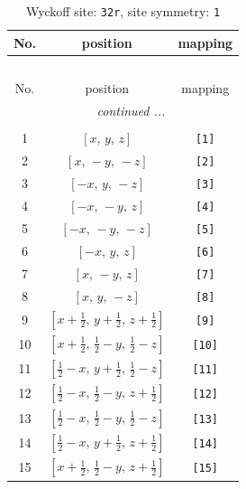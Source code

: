 \documentclass[fleqn,8pt]{jsarticle}
\begin{document}
\renewcommand{\arraystretch}{1.2}
\begin{longtable}{ccc}
\caption{Wyckoff site: {\tt 32r}, site symmetry: {\tt 1}}
 \\
 \hline \hline
No. & position & mapping \\ \hline \endfirsthead

\multicolumn{2}{l}{\tablename\ \thetable{}} \\
 \hline \hline
No. & position & mapping \\ \hline \endhead

 \hline \hline
\multicolumn{2}{r}{\footnotesize\it continued ...} \\ \endfoot

 \hline \hline
\multicolumn{2}{r}{} \\ \endlastfoot

1 & $\left[ x,\, y,\, z \right]$ & {\tt [1]} \\ \hline
2 & $\left[ x,\, - y,\, - z \right]$ & {\tt [2]} \\ \hline
3 & $\left[ - x,\, y,\, - z \right]$ & {\tt [3]} \\ \hline
4 & $\left[ - x,\, - y,\, z \right]$ & {\tt [4]} \\ \hline
5 & $\left[ - x,\, - y,\, - z \right]$ & {\tt [5]} \\ \hline
6 & $\left[ - x,\, y,\, z \right]$ & {\tt [6]} \\ \hline
7 & $\left[ x,\, - y,\, z \right]$ & {\tt [7]} \\ \hline
8 & $\left[ x,\, y,\, - z \right]$ & {\tt [8]} \\ \hline
9 & $\left[ x + \frac{1}{2},\, y + \frac{1}{2},\, z + \frac{1}{2} \right]$ & {\tt [9]} \\ \hline
10 & $\left[ x + \frac{1}{2},\, \frac{1}{2} - y,\, \frac{1}{2} - z \right]$ & {\tt [10]} \\ \hline
11 & $\left[ \frac{1}{2} - x,\, y + \frac{1}{2},\, \frac{1}{2} - z \right]$ & {\tt [11]} \\ \hline
12 & $\left[ \frac{1}{2} - x,\, \frac{1}{2} - y,\, z + \frac{1}{2} \right]$ & {\tt [12]} \\ \hline
13 & $\left[ \frac{1}{2} - x,\, \frac{1}{2} - y,\, \frac{1}{2} - z \right]$ & {\tt [13]} \\ \hline
14 & $\left[ \frac{1}{2} - x,\, y + \frac{1}{2},\, z + \frac{1}{2} \right]$ & {\tt [14]} \\ \hline
15 & $\left[ x + \frac{1}{2},\, \frac{1}{2} - y,\, z + \frac{1}{2} \right]$ & {\tt [15]} \\ \hline

\end{longtable}
\end{document}
